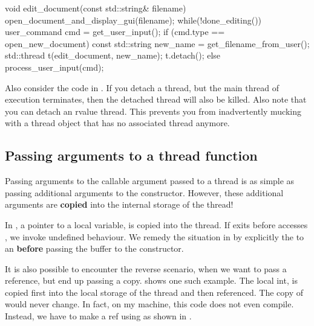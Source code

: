 \begin{CPP}[label=list:word-processor,caption=Detaching a thread to handle other documents]
void edit_document(const std::string& filename) {
    open_document_and_display_gui(filename);
    while(!done_editing()) {
        user_command cmd = get_user_input();
        if (cmd.type == open_new_document) {
            const std::string new_name = get_filename_from_user();
            std::thread t(edit_document, new_name);
            t.detach();
        }
        else {
            process_user_input(cmd);
        }
    }
}
\end{CPP}

Also consider the code in . If you detach a thread, but the main thread of execution terminates, then the detached thread will also be killed. Also note that you can detach an rvalue thread. This prevents you from inadvertently mucking with a thread object that has no associated thread anymore.



\subsection{Passing arguments to a thread function}
Passing arguments to the callable argument passed to a thread is as simple as passing additional arguments to the  constructor. However, these additional arguments are \textbf{copied} into the internal storage of the thread!

In , a pointer to a local variable,  is copied into the thread. If  exits before  accesses , we invoke undefined behaviour. We remedy the situation in  by explicitly the  to an  \textbf{before} passing the buffer to the constructor.


It is also possible to encounter the reverse scenario, when we want to pass a reference, but end up passing a copy.  shows one such example. The local int,  is copied first into the local storage of the thread and then referenced. The copy of  would never change. In fact, on my machine, this code does not even compile. Instead, we have to make a ref using  as shown in .

